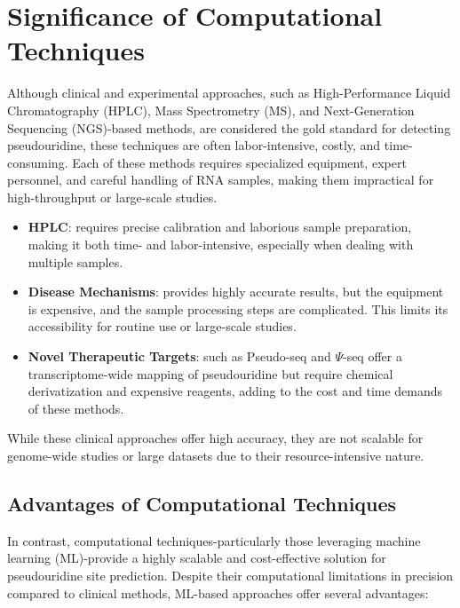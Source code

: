 \section{Significance of Computational Techniques}\label{sec:significance-of-computational-techniques}
  Although clinical and experimental approaches, such as High-Performance Liquid Chromatography (HPLC), Mass Spectrometry (MS), and Next-Generation Sequencing (NGS)-based methods, are considered the gold standard for detecting pseudouridine, these techniques are often labor-intensive, costly, and time-consuming.
  Each of these methods requires specialized equipment, expert personnel, and careful handling of RNA samples, making them impractical for high-throughput or large-scale studies.

  \begin{itemize}
    \item \textbf{HPLC}: requires precise calibration and laborious sample preparation, making it both time- and labor-intensive, especially when dealing with multiple samples.
    \item \textbf{Disease Mechanisms}: provides highly accurate results, but the equipment is expensive, and the sample processing steps are complicated.
    This limits its accessibility for routine use or large-scale studies.
    \item \textbf{Novel Therapeutic Targets}: such as Pseudo-seq and $\Psi$-seq offer a transcriptome-wide mapping of pseudouridine but require chemical derivatization and expensive reagents, adding to the cost and time demands of these methods.
  \end{itemize}

  While these clinical approaches offer high accuracy, they are not scalable for genome-wide studies or large datasets due to their resource-intensive nature.

  \subsection*{Advantages of Computational Techniques}
    In contrast, computational techniques-particularly those leveraging machine learning (ML)-provide a highly scalable and cost-effective solution for pseudouridine site prediction.
    Despite their computational limitations in precision compared to clinical methods, ML-based approaches offer several advantages:

